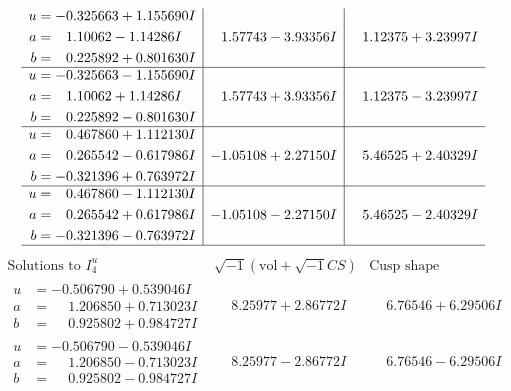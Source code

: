 \documentclass[1p]{elsarticle_modified}
\theoremstyle{definition}
\newcommand{\I}{\sqrt{-1}}
\begin{document}
$$\begin{array}{c|c|c}
\begin{aligned}
u &= -0.325663 + 1.155690 I \\
a &= \phantom{-}1.10062 - 1.14286 I \\
b &= \phantom{-}0.225892 + 0.801630 I\end{aligned}
 & \phantom{-}1.57743 - 3.93356 I & \phantom{-}1.12375 + 3.23997 I \\ \hline\begin{aligned}
u &= -0.325663 - 1.155690 I \\
a &= \phantom{-}1.10062 + 1.14286 I \\
b &= \phantom{-}0.225892 - 0.801630 I\end{aligned}
 & \phantom{-}1.57743 + 3.93356 I & \phantom{-}1.12375 - 3.23997 I \\ \hline\begin{aligned}
u &= \phantom{-}0.467860 + 1.112130 I \\
a &= \phantom{-}0.265542 - 0.617986 I \\
b &= -0.321396 + 0.763972 I\end{aligned}
 & -1.05108 + 2.27150 I & \phantom{-}5.46525 + 2.40329 I \\ \hline\begin{aligned}
u &= \phantom{-}0.467860 - 1.112130 I \\
a &= \phantom{-}0.265542 + 0.617986 I \\
b &= -0.321396 - 0.763972 I\end{aligned}
 & -1.05108 - 2.27150 I & \phantom{-}5.46525 - 2.40329 I\\
 \hline 
 \end{array}$$\newpage$$\begin{array}{c|c|c}  
\text{Solutions to }I^u_{4}& \I (\text{vol} + \sqrt{-1}CS) & \text{Cusp shape}\\
 \hline 
\begin{aligned}
u &= -0.506790 + 0.539046 I \\
a &= \phantom{-}1.206850 + 0.713023 I \\
b &= \phantom{-}0.925802 + 0.984727 I\end{aligned}
 & \phantom{-}8.25977 + 2.86772 I & \phantom{-}6.76546 + 6.29506 I \\ \hline\begin{aligned}
u &= -0.506790 - 0.539046 I \\
a &= \phantom{-}1.206850 - 0.713023 I \\
b &= \phantom{-}0.925802 - 0.984727 I\end{aligned}
 & \phantom{-}8.25977 - 2.86772 I & \phantom{-}6.76546 - 6.29506 I \\ \hline\begin{aligned}

\end{aligned}
\end{array}$$
\end{document}
